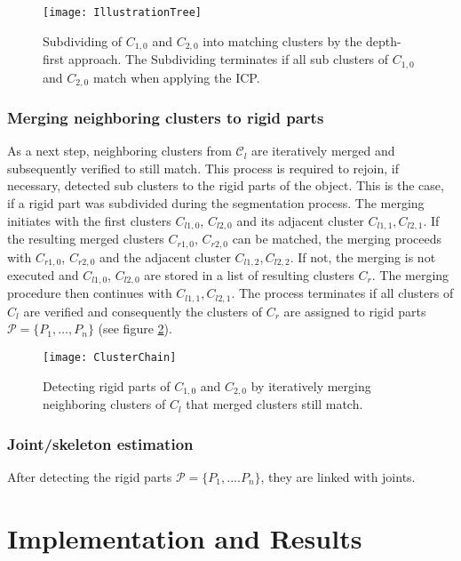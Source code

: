 \begin{figure}
	\centering
	\texttt{[image: IllustrationTree]}
	\caption{Subdividing of $C_{1,0}$ and $C_{2,0}$ into matching clusters by the depth-first approach. The Subdividing terminates if all sub clusters of $C_{1,0}$ and $C_{2,0}$ match when applying the ICP.}
	\label{fig:illustrationTree}
\end{figure}

\subsection{Merging neighboring clusters to rigid parts}

As a next step, neighboring clusters from $\mathcal{C}_l$ are iteratively merged and subsequently verified to still match. This process is required to rejoin, if necessary, detected sub clusters to the rigid parts of the object. This is the case, if a rigid part was subdivided during the segmentation process. The merging initiates with the first clusters $C_{l1,0}$, $C_{l2,0}$ and its adjacent cluster $C_{l1,1},C_{l2,1}$. If the resulting merged clusters $C_{r1,0}$, $C_{r2,0}$ can be matched, the merging proceeds with $C_{r1,0}$, $C_{r2,0}$ and the adjacent cluster $C_{l1,2},C_{l2,2}$. If not, the merging is not executed and $C_{l1,0}$, $C_{l2,0}$ are stored in a list of resulting clusters $C_r$. The merging procedure then continues with $C_{l1,1},C_{l2,1}$. The process terminates if all clusters of $C_l$ are verified and consequently the clusters of $C_r$ are assigned to rigid parts $ \mathcal{P} =  \{P_1,\ldots,P_n\}$ (see figure \ref{fig:clusterChain}). 

\begin{figure}
	\centering
	\texttt{[image: ClusterChain]}
	\caption{Detecting rigid parts of $C_{1,0}$ and $C_{2,0}$ by iteratively merging neighboring clusters of $C_l$ that merged clusters still match.}
	\label{fig:clusterChain}
\end{figure}

\subsection{Joint/skeleton estimation}

After detecting the rigid parts $\mathcal{P} =  \{ {P_1,....P_n}\}$, they are linked with joints.

\chapter{Implementation and Results}

